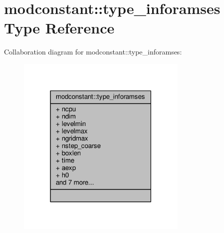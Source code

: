 \hypertarget{structmodconstant_1_1type__inforamses}{}\section{modconstant\+:\+:type\+\_\+inforamses Type Reference}
\label{structmodconstant_1_1type__inforamses}


Collaboration diagram for modconstant\+:\+:type\+\_\+inforamses\+:\nopagebreak
\begin{figure}[H]
\begin{center}
\leavevmode
\includegraphics[width=231pt]{structmodconstant_1_1type__inforamses__coll__graph}
\end{center}
\end{figure}
